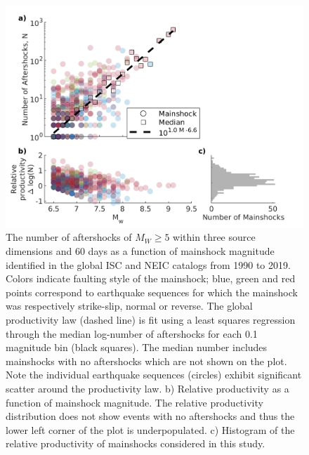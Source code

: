 \documentclass[draft]{agujournal}
\begin{document}
\begin{figure}[!ht]
\centering
\includegraphics{figures/prod_law_mw5.png}
\caption{The number of aftershocks of $M_W\ge5$ within three source dimensions and 60 days as a function of mainshock magnitude identified in the global ISC and NEIC catalogs from 1990 to 2019. Colors indicate faulting style of the mainshock; blue, green and red points correspond to earthquake sequences for which the mainshock was respectively strike-slip, normal or reverse. The global productivity law (dashed line) is fit using a least squares regression through the median log-number of aftershocks for each 0.1 magnitude bin (black squares). The median number includes mainshocks with no aftershocks which are not shown on the plot. Note the individual earthquake sequences (circles) exhibit significant scatter around the productivity law. b) Relative productivity as a function of mainshock magnitude. The relative productivity distribution does not show events with no aftershocks and thus the lower left corner of the plot is underpopulated. c) Histogram of the relative productivity of mainshocks considered in this study.
}
\label{fig:fms_prod}
\end{figure}
\end{document}
